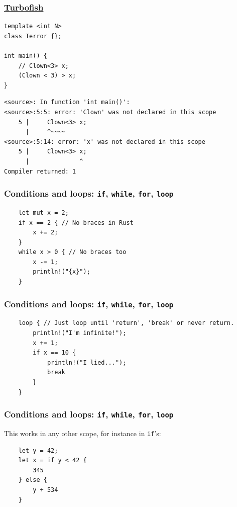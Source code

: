 \documentclass[aspectratio=1610,t]{beamer}
\begin{document}

\begin{frame}[fragile]
\frametitle{\href{https://www.reddit.com/r/rust/comments/v4rir6/turbofish_why/}{Turbofish}}
\begin{verbatim}
template <int N>
class Terror {};

int main() {
    // Clown<3> x;
    (Clown < 3) > x;
}
\end{verbatim}

\begin{verbatim}
<source>: In function 'int main()':
<source>:5:5: error: 'Clown' was not declared in this scope
    5 |     Clown<3> x;
      |     ^~~~~
<source>:5:14: error: 'x' was not declared in this scope
    5 |     Clown<3> x;
      |              ^
Compiler returned: 1
\end{verbatim}

\end{frame}


\begin{frame}[fragile]
\frametitle{Conditions and loops: \texttt{if}, \texttt{while}, \texttt{for}, \texttt{loop}}
\begin{verbatim}
    let mut x = 2;
    if x == 2 { // No braces in Rust
        x += 2;
    }
    while x > 0 { // No braces too
        x -= 1;
        println!("{x}");
    }
\end{verbatim}
\end{frame}


\begin{frame}[fragile]
\frametitle{Conditions and loops: \texttt{if}, \texttt{while}, \texttt{for}, \texttt{loop}}
\begin{verbatim}
    loop { // Just loop until 'return', 'break' or never return.
        println!("I'm infinite!");
        x += 1;
        if x == 10 {
            println!("I lied...");
            break
        }
    }
\end{verbatim}
\end{frame}


\begin{frame}[fragile]
\frametitle{Conditions and loops: \texttt{if}, \texttt{while}, \texttt{for}, \texttt{loop}}
This works in any other scope, for instance in \texttt{if}'s:

\begin{verbatim}
    let y = 42;
    let x = if y < 42 {
        345
    } else {
        y + 534
    }
\end{verbatim}
\end{frame}
\end{document}
